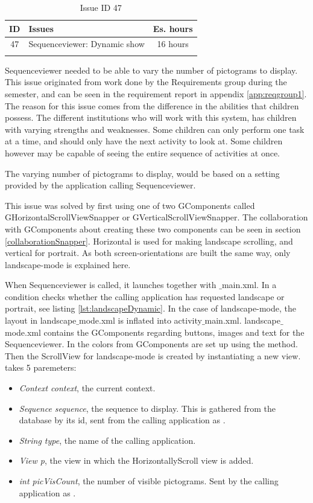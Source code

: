 \begin{longtable} { | c | p{12cm} | c | } 
\hline
	ID 	&	Issues	&		 Es. hours \\\hline
	 47	&	Sequenceviewer: Dynamic show	&	16 hours \\\hline
\caption{Issue ID 47}
\label{tab:spr3_SVdynamicshow}
\end{longtable}

Sequenceviewer needed to be able to vary the number of pictograms to display. This issue originated from work done by the Requirements group during the semester, and can be seen in the requirement report in appendix \ref{app:reqgroup1}. The reason for this issue comes from the difference in the abilities that children possess. The different institutions who will work with this system, has children with varying strengths and weaknesses. Some children can only perform one task at a time, and should only have the next activity to look at. Some children however may be capable of seeing the entire sequence of activities at once. 

The varying number of pictograms to display, would be based on a setting provided by the application calling Sequenceviewer.

This issue was solved by first using one of two GComponents called GHorizontalScrollViewSnapper or GVerticalScrollViewSnapper. The collaboration with GComponents about creating these two components can be seen in section \ref{collaborationSnapper}. Horizontal is used for making landscape scrolling, and vertical for portrait. As both screen-orientations are built the same way, only landscape-mode is explained here. 

When Sequenceviewer is called, it launches  together with $\_$main.xml. In  a condition checks whether the calling application has requested landscape or portrait, see listing \ref{lst:landscapeDynamic}. In the case of landscape-mode, the layout in landscape$\_$mode.xml is inflated into activity$\_$main.xml. landscape$\_$mode.xml contains the GComponents regarding buttons, images and text for the Sequenceviewer. In  the colors from GComponents are set up using the  method. Then the ScrollView for landscape-mode is created by instantiating a new  view.  takes 5 paremeters:
\begin{itemize}
\item \textit{Context context}, the current context.
\item \textit{Sequence sequence}, the sequence to display. This is gathered from the database by its id, sent from the calling application as .
\item \textit{String type}, the name of the calling application.
\item \textit{View p}, the view in which the HorizontallyScroll view is added.
\item \textit{int picVisCount}, the number of visible pictograms. Sent by the calling application as .
\end{itemize}

